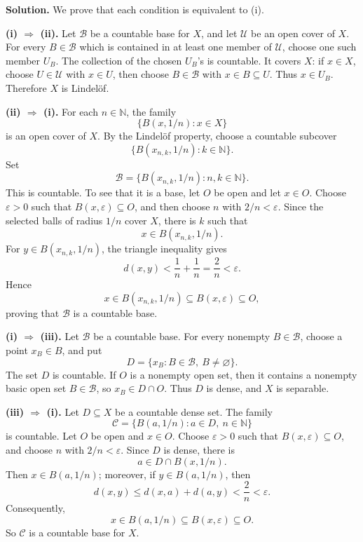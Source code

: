 \documentclass{article}
\newcommand{\N}{\mathbb{N}}
\newenvironment{solution}{\par\noindent\textbf{Solution.}\quad}{\par}
\begin{document}
\begin{solution}
  We prove that each condition is equivalent to (i).

  \textbf{(i) $\Rightarrow$ (ii).}
  Let $\mathcal{B}$ be a countable base for $X$, and let $\mathcal{U}$ be
  an open cover of $X$. For every $B\in\mathcal{B}$ which is contained in
  at least one member of $\mathcal{U}$, choose one such member $U_B$.
  The collection of the chosen $U_B$'s is countable. It covers $X$:
  if $x\in X$, choose $U\in\mathcal{U}$ with $x\in U$, then choose
  $B\in\mathcal{B}$ with $x\in B\subseteq U$. Thus $x\in U_B$.
  Therefore $X$ is Lindel\"of.

  \textbf{(ii) $\Rightarrow$ (i).}
  For each $n\in\N$, the family
  \[
    \{B(x,1/n):x\in X\}
  \]
  is an open cover of $X$. By the Lindel\"of property, choose a countable
  subcover
  \[
    \{B(x_{n,k},1/n):k\in\N\}.
  \]
  Set
  \[
    \mathcal{B}=\{B(x_{n,k},1/n):n,k\in\N\}.
  \]
  This is countable. To see that it is a base, let $O$ be open and let
  $x\in O$. Choose $\varepsilon>0$ such that $B(x,\varepsilon)\subseteq O$,
  and then choose $n$ with $2/n<\varepsilon$. Since the selected balls of
  radius $1/n$ cover $X$, there is $k$ such that
  \[
    x\in B(x_{n,k},1/n).
  \]
  For $y\in B(x_{n,k},1/n)$, the triangle inequality gives
  \[
    d(x,y)<\frac1n+\frac1n=\frac2n<\varepsilon.
  \]
  Hence
  \[
    x\in B(x_{n,k},1/n)\subseteq B(x,\varepsilon)\subseteq O,
  \]
  proving that $\mathcal{B}$ is a countable base.

  \textbf{(i) $\Rightarrow$ (iii).}
  Let $\mathcal{B}$ be a countable base. For every nonempty
  $B\in\mathcal{B}$, choose a point $x_B\in B$, and put
  \[
    D=\{x_B:B\in\mathcal{B},\ B\ne\varnothing\}.
  \]
  The set $D$ is countable. If $O$ is a nonempty open set, then it contains
  a nonempty basic open set $B\in\mathcal{B}$, so $x_B\in D\cap O$.
  Thus $D$ is dense, and $X$ is separable.

  \textbf{(iii) $\Rightarrow$ (i).}
  Let $D\subseteq X$ be a countable dense set. The family
  \[
    \mathcal{C}=\{B(a,1/n):a\in D,\ n\in\N\}
  \]
  is countable. Let $O$ be open and $x\in O$. Choose $\varepsilon>0$ such
  that $B(x,\varepsilon)\subseteq O$, and choose $n$ with $2/n<\varepsilon$.
  Since $D$ is dense, there is
  \[
    a\in D\cap B(x,1/n).
  \]
  Then $x\in B(a,1/n)$; moreover, if $y\in B(a,1/n)$, then
  \[
    d(x,y)\le d(x,a)+d(a,y)<\frac2n<\varepsilon.
  \]
  Consequently,
  \[
    x\in B(a,1/n)\subseteq B(x,\varepsilon)\subseteq O.
  \]
  So $\mathcal{C}$ is a countable base for $X$.
\end{solution}
\end{document}
